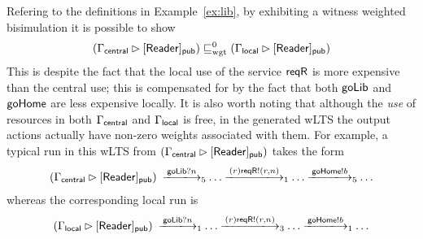 \documentclass{LMCS}
\newcommand{\with}{\mathbin \rhd}
\newcommand{\amort}[1]{\mathrel{\sqsubseteq_{\rm wgt}^{#1}}}
\newcommand{\Cloc}[2]{[#1]_{\ownfnt{#2}}}
\newcommand{\ar}[1]{\mathbin{\xlongrightarrow{ #1}}}
\begin{document}
\begin{exa}\label{ex:libagain}
  Refering to the definitions in Example~\ref{ex:lib}, by exhibiting a witness weighted bisimulation it is
possible to show
\begin{align*}
  ( \Gamma_{\central} \with \Cloc{\Reader}{\Cpublic})   \amort{0} (\Gamma_{\local} \with \Cloc{\Reader}{\Cpublic})
\end{align*}
This is despite the fact that the local use of the service $\mathsf{reqR}$ is
more expensive than the central use; this is compensated for by the
fact that both $\mathsf{goLib}$ and $\mathsf{goHome}$ are less expensive locally. It
is also worth noting that although the \emph{use} of resources in both
$\Gamma_{\mathsf{central}}$ and $\Gamma_{\mathsf{local}}$ is free, in the generated
wLTS the output actions actually have non-zero weights associated with
them. For example, a typical run in this wLTS from $ (
\Gamma_{\central} \with \Cloc{\Reader}{\Cpublic}) $ takes the form
\begin{align*}
    ( \Gamma_{\central} \with \Cloc{\Reader}{\Cpublic}) \;
 \ar{\goLib?n}_{5} \ldots  \ar{(r)\reqR!(r,n)}_1 \ldots \ar{\goHome!b}_5 \ldots
\end{align*}
whereas the corresponding local run is 
\begin{align*}
    ( \Gamma_{\local} \with \Cloc{\Reader}{\Cpublic})  \;
 \ar{\goLib?n}_{1} \ldots  \ar{(r)\reqR!(r,n)}_3 \ldots \ar{\goHome!b}_1 \ldots
\end{align*}





\end{exa}
\end{document}
